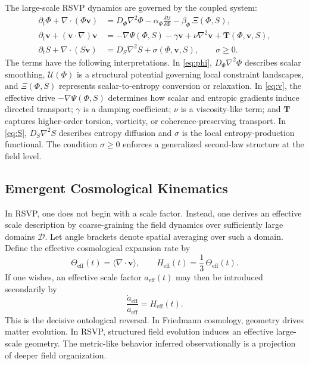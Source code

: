 \documentclass[12pt,a4paper]{article}
\theoremstyle{remark}
\newcommand{\vv}{\mathbf{v}}
\newcommand{\Heff}{H_{\mathrm{eff}}}
\begin{document}
The large-scale RSVP dynamics are governed by the coupled system:
\begin{align}
\partial_t \Phi + \nabla \cdot (\Phi \vv) &= D_\Phi \nabla^2 \Phi
  - \alpha_\Phi \frac{\delta \mathcal{U}}{\delta \Phi}
  - \beta_\Phi \,\Xi(\Phi,S), \label{eq:phi} \\[0.5em]
\partial_t \vv + (\vv\cdot\nabla)\vv &= -\nabla \Psi(\Phi,S) - \gamma \vv
  + \nu \nabla^2 \vv + \mathbf{T}(\Phi,\vv,S), \label{eq:v} \\[0.5em]
\partial_t S + \nabla\cdot(S\vv) &= D_S \nabla^2 S + \sigma(\Phi,\vv,S),
  \qquad \sigma \ge 0. \label{eq:S}
\end{align}
The terms have the following interpretations. In \eqref{eq:phi}, $D_\Phi \nabla^2 \Phi$ describes scalar smoothing, $\mathcal{U}(\Phi)$ is a structural potential governing local constraint landscapes, and $\Xi(\Phi,S)$ represents scalar-to-entropy conversion or relaxation. In \eqref{eq:v}, the effective drive $-\nabla\Psi(\Phi,S)$ determines how scalar and entropic gradients induce directed transport; $\gamma$ is a damping coefficient; $\nu$ is a viscosity-like term; and $\mathbf{T}$ captures higher-order torsion, vorticity, or coherence-preserving transport. In \eqref{eq:S}, $D_S \nabla^2 S$ describes entropy diffusion and $\sigma$ is the local entropy-production functional. The condition $\sigma \ge 0$ enforces a generalized second-law structure at the field level.

\subsection{Emergent Cosmological Kinematics}

In RSVP, one does not begin with a scale factor. Instead, one derives an effective scale description by coarse-graining the field dynamics over sufficiently large domains $\mathcal{D}$. Let angle brackets denote spatial averaging over such a domain. Define the effective cosmological expansion rate by
\begin{equation}
\Theta_{\mathrm{eff}}(t) = \langle \nabla \cdot \vv \rangle, \qquad
\Heff(t) = \frac{1}{3}\,\Theta_{\mathrm{eff}}(t).
\end{equation}
If one wishes, an effective scale factor $a_{\mathrm{eff}}(t)$ may then be introduced secondarily by
\begin{equation}
\frac{\dot a_{\mathrm{eff}}}{a_{\mathrm{eff}}} = \Heff(t).
\end{equation}
This is the decisive ontological reversal. In Friedmann cosmology, geometry drives matter evolution. In RSVP, structured field evolution induces an effective large-scale geometry. The metric-like behavior inferred observationally is a projection of deeper field organization.
\end{document}

